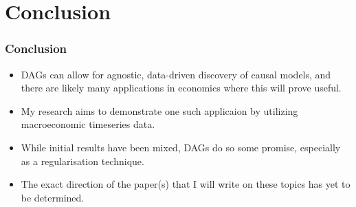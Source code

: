 \documentclass{beamer}
\begin{document}
\section{Conclusion}
\begin{frame}
    \frametitle{Conclusion}
    \begin{itemize}
        \item DAGs can allow for agnostic, data-driven discovery of causal models, and there are likely many applications in economics where this will prove useful.
        \item My research aims to demonstrate one such applicaion by utilizing macroeconomic timeseries data.
        \item While initial results have been mixed, DAGs do so some promise, especially as a regularisation technique.
        \item The exact direction of the paper(s) that I will write on these topics has yet to be determined.
    \end{itemize}
\end{frame}
\end{document}
